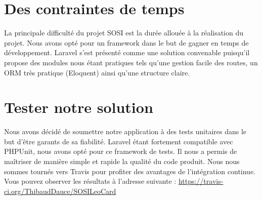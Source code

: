 \section{Des contraintes de temps}

La principale difficulté du projet SOSI est la durée allouée à la réalisation du projet.
Nous avons opté pour un framework dans le but de gagner en temps de développement. Laravel
s'est présenté comme une solution convenable puisqu'il propose des modules nous étant pratiques
tels qu'une gestion facile des routes, un ORM très pratique (Eloquent) ainsi qu'une structure
claire.

\section{Tester notre solution}

Nous avons décidé de soumettre notre application à des tests unitaires dans le but d'être garants de sa fiabilité. Laravel étant fortement compatible avec PHPUnit, nous avons opté pour ce framework de tests. Il nous a permis de maîtriser de manière simple et rapide la qualité du code produit. Nous nous sommes tournés vers Travis pour profiter des avantages de l'intégration continue. Vous pouvez observer les résultats à l'adresse suivante : \url{https://travis-ci.org/ThibaudDauce/SOSILeoCard}
